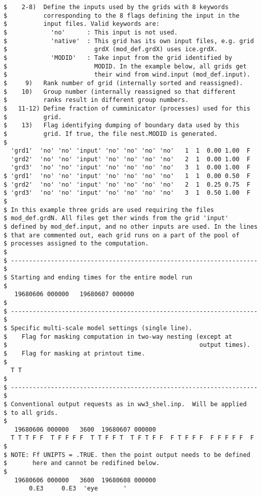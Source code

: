 \begin{verbatim}
$    2-8)  Define the inputs used by the grids with 8 keywords 
$          corresponding to the 8 flags defining the input in the
$          input files. Valid keywords are:
$            'no'      : This input is not used.
$            'native'  : This grid has its own input files, e.g. grid
$                        grdX (mod_def.grdX) uses ice.grdX.
$            'MODID'   : Take input from the grid identified by 
$                        MODID. In the example below, all grids get
$                        their wind from wind.input (mod_def.input).
$     9)   Rank number of grid (internally sorted and reassigned).
$    10)   Group number (internally reassigned so that different
$          ranks result in different group numbers.
$   11-12) Define fraction of cumminicator (processes) used for this
$          grid.
$    13)   Flag identifying dumping of boundary data used by this
$          grid. If true, the file nest.MODID is generated.
$
  'grd1'  'no' 'no' 'input' 'no' 'no' 'no' 'no'   1  1  0.00 1.00  F
  'grd2'  'no' 'no' 'input' 'no' 'no' 'no' 'no'   2  1  0.00 1.00  F
  'grd3'  'no' 'no' 'input' 'no' 'no' 'no' 'no'   3  1  0.00 1.00  F
$ 'grd1'  'no' 'no' 'input' 'no' 'no' 'no' 'no'   1  1  0.00 0.50  F
$ 'grd2'  'no' 'no' 'input' 'no' 'no' 'no' 'no'   2  1  0.25 0.75  F
$ 'grd3'  'no' 'no' 'input' 'no' 'no' 'no' 'no'   3  1  0.50 1.00  F
$
$ In this example three grids are used requiring the files
$ mod_def.grdN. All files get ther winds from the grid 'input'
$ defined by mod_def.input, and no other inputs are used. In the lines
$ that are commented out, each grid runs on a part of the pool of
$ processes assigned to the computation.
$
$ -------------------------------------------------------------------- $
$ Starting and ending times for the entire model run
$
   19680606 000000   19680607 000000
$
$ -------------------------------------------------------------------- $
$ Specific multi-scale model settings (single line).
$    Flag for masking computation in two-way nesting (except at 
$                                                     output times).
$    Flag for masking at printout time.
$
  T T
$
$ -------------------------------------------------------------------- $
$ Conventional output requests as in ww3_shel.inp.  Will be applied
$ to all grids.
$
   19680606 000000   3600  19680607 000000
  T T T F F  T F F F F  T T F F T  T F T F F  F T F F F  F F F F F  F
$
$ NOTE: Ff UNIPTS = .TRUE. then the point output needs to be defined
$       here and cannot be redifined below.
$
   19680606 000000   3600  19680608 000000
       0.E3     0.E3  'eye       '

\end{verbatim}
